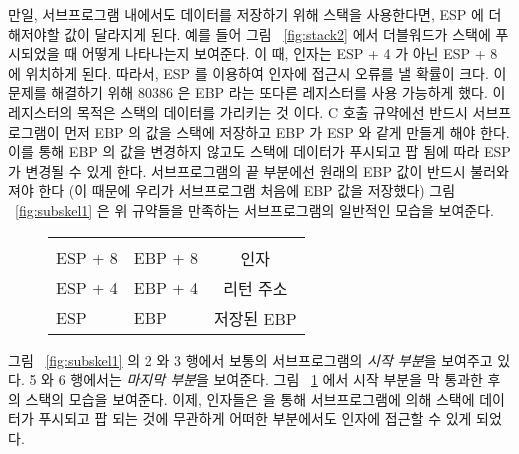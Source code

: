 만일, 서브프로그램 내에서도 데이터를 저장하기 위해 스택을 사용한다면, 
ESP 에 더해저야할 값이 달라지게 된다. 예를 들어 그림 ~\ref{fig:stack2} 에서
더블워드가 스택에 푸시되었을 때 어떻게 나타나는지 보여준다. 이 때, 
인자는 {\code ESP + 4} 가 아닌 {\code ESP + 8} 에 위치하게 된다. 따라서,
ESP 를 이용하여 인자에 접근시 오류를 낼 확률이 크다. 이 문제를 해결하기 위해
80386 은 EBP 라는 또다른 레지스터를 사용 가능하게 했다. 이 레지스터의 목적은 
스택의 데이터를 가리키는 것 이다. C 호출 규약에선 반드시 서브프로그램이 먼저 EBP 
의 값을 스택에 저장하고 EBP 가 ESP 와 같게 만들게 해야 한다. 이를 통해 EBP 의 값을
변경하지 않고도 스택에 데이터가 푸시되고 팝 됨에 따라 ESP 가 변경될 수 있게 
한다. 서브프로그램의 끝 부분에선 원래의 EBP 값이 반드시 불러와져야 한다
(이 때문에 우리가 서브프로그램 처음에 EBP 값을 저장했다) 그림 ~\ref{fig:subskel1}
은 위 규약들을 만족하는 서브프로그램의 일반적인 모습을 보여준다. 

\begin{figure}[t]
\centering
\begin{tabular}{ll|c|}
\cline{3-3}
&  & \\ \cline{3-3}
ESP + 8 & EBP + 8 & 인자 \\ \cline{3-3}
ESP + 4 & EBP + 4 & 리턴 주소\\ \cline{3-3}
ESP     & EBP     & 저장된 EBP \\ \cline{3-3}
\end{tabular}
\caption{}
\label{fig:stack3}
\end{figure}

그림 ~\ref{fig:subskel1} 의 2 와 3 행에서 보통의 서브프로그램의 
\emph{시작 부분}을 보여주고 있다. 5 와 6 행에서는 \emph{마지막 부분}을 
보여준다. 그림 ~\ref{fig:stack3} 에서 시작 부분을 막 통과한 후의 스택의
모습을 보여준다. 이제, 인자들은 {\code [EBP + 8]} 을 통해
서브프로그램에 의해 스택에 데이터가 푸시되고 팝 되는 것에 무관하게 
어떠한 부분에서도 인자에 접근할 수 있게 되었다. 

